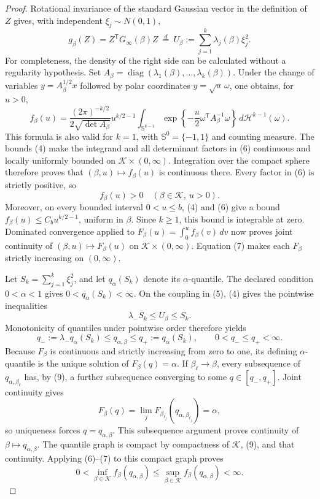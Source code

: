 \documentclass{article}
\begin{document}
\begin{proof}
Rotational invariance of the standard Gaussian vector in the definition of \(Z\) gives, with independent \(\xi_j\sim N(0,1)\),
\[
g_\beta(Z)=Z^{\mathsf T}G_\infty(\beta)Z
\ \stackrel{d}{=}\ 
U_\beta:=\sum_{j=1}^{k}\lambda_j(\beta)\xi_j^2.
\tag{5}
\]
For completeness, the density of the right side can be calculated without a regularity hypothesis.  Set
\(A_\beta=\operatorname{diag}(\lambda_1(\beta),\ldots,\lambda_k(\beta))\).  Under the change of variables \(y=A_\beta^{1/2}x\) followed by polar coordinates \(y=\sqrt u\,\omega\), one obtains, for \(u>0\),
\[
f_\beta(u)
=\frac{(2\pi)^{-k/2}}{2\sqrt{\det A_\beta}}
u^{k/2-1}
\int_{\mathbb S^{k-1}}
\exp\!\left\{-\frac u2\omega^{\mathsf T}A_\beta^{-1}\omega\right\}
\,d\mathcal H^{k-1}(\omega).
\tag{6}
\]
This formula is also valid for \(k=1\), with \(\mathbb S^0=\{-1,1\}\) and counting measure.  The bounds (4) make the integrand and all determinant factors in (6) continuous and locally uniformly bounded on \(\mathcal K\times(0,\infty)\).  Integration over the compact sphere therefore proves that \((\beta,u)\mapsto f_\beta(u)\) is continuous there.  Every factor in (6) is strictly positive, so
\[
f_\beta(u)>0
\quad(\beta\in\mathcal K,\ u>0).
\tag{7}
\]
Moreover, on every bounded interval \(0<u\leq b\), (4) and (6) give a bound \(f_\beta(u)\leq C_bu^{k/2-1}\), uniform in \(\beta\).  Since \(k\geq1\), this bound is integrable at zero.  Dominated convergence applied to
\(F_\beta(u)=\int_0^u f_\beta(v)\,dv\) now proves joint continuity of \((\beta,u)\mapsto F_\beta(u)\) on \(\mathcal K\times(0,\infty)\).  Equation (7) makes each \(F_\beta\) strictly increasing on \((0,\infty)\).

Let \(S_k=\sum_{j=1}^k\xi_j^2\), and let \(q_\alpha(S_k)\) denote its \(\alpha\)-quantile.  The declared condition \(0<\alpha<1\) gives \(0<q_\alpha(S_k)<\infty\).  On the coupling in (5), (4) gives the pointwise inequalities
\[
\lambda_-S_k\leq U_\beta\leq S_k.
\tag{8}
\]
Monotonicity of quantiles under pointwise order therefore yields
\[
q_-:=\lambda_-q_\alpha(S_k)
\leq q_{\alpha,\beta}
\leq q_+:=q_\alpha(S_k),
\qquad 0<q_-\leq q_+<\infty.
\tag{9}
\]
Because \(F_\beta\) is continuous and strictly increasing from zero to one, its defining \(\alpha\)-quantile is the unique solution of
\(F_\beta(q)=\alpha\).  If \(\beta_\ell\to\beta\), every subsequence of \(q_{\alpha,\beta_\ell}\) has, by (9), a further subsequence converging to some \(q\in[q_-,q_+]\).  Joint continuity gives
\[
F_\beta(q)
=\lim_jF_{\beta_{\ell_j}}(q_{\alpha,\beta_{\ell_j}})
=\alpha,
\tag{10}
\]
so uniqueness forces \(q=q_{\alpha,\beta}\).  This subsequence argument proves continuity of \(\beta\mapsto q_{\alpha,\beta}\).  The quantile graph is compact by compactness of \(\mathcal K\), (9), and that continuity.  Applying (6)--(7) to this compact graph proves
\[
0<\inf_{\beta\in\mathcal K}f_\beta(q_{\alpha,\beta})
\leq\sup_{\beta\in\mathcal K}f_\beta(q_{\alpha,\beta})<\infty.
\tag{11}
\]


\end{proof}
\end{document}
